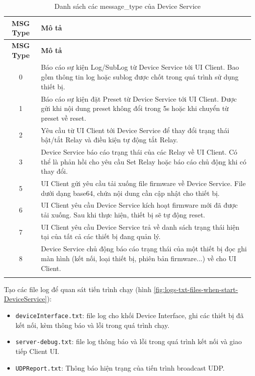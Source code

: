 \begin{longtable}{|c|p{11cm}|}
\hline
\textbf{MSG Type} & \textbf{Mô tả} \\
\hline
\endfirsthead

\hline
\textbf{MSG Type} & \textbf{Mô tả} \\
\hline
\endhead

0 & Báo cáo sự kiện Log/SubLog từ Device Service tới UI Client. Bao gồm thông tin log hoặc sublog được chốt trong quá trình sử dụng thiết bị. \\
\hline

1 & Báo cáo sự kiện đặt Preset từ Device Service tới UI Client. Được gửi khi nội dung preset không đổi trong 5s hoặc khi chuyển từ preset về reset. \\
\hline

2 & Yêu cầu từ UI Client tới Device Service để thay đổi trạng thái bật/tắt Relay và điều kiện tự động tắt Relay. \\
\hline

3 & Device Service báo cáo trạng thái của các Relay về UI Client. Có thể là phản hồi cho yêu cầu Set Relay hoặc báo cáo chủ động khi có thay đổi. \\
\hline

5 & UI Client gửi yêu cầu tải xuống file firmware về Device Service. File dưới dạng base64, chứa nội dung cần cập nhật cho thiết bị. \\
\hline

6 & UI Client yêu cầu Device Service kích hoạt firmware mới đã được tải xuống. Sau khi thực hiện, thiết bị sẽ tự động reset. \\
\hline

7 & UI Client yêu cầu Device Service trả về danh sách trạng thái hiện tại của tất cả các thiết bị đang quản lý. \\
\hline

8 & Device Service chủ động báo cáo trạng thái của một thiết bị đọc ghi màn hình (kết nối, loại thiết bị, phiên bản firmware...) về cho UI Client. \\
\hline

\caption{Danh sách các message\_type của Device Service}
\label{tab:message-types}
\end{longtable}

\FloatBarrier


Tạo các file log để quan sát tiến trình chạy (hình \ref{fig:logs-txt-files-when-start-DeviceService}):

\begin{itemize}
    \item \texttt{deviceInterface.txt}: file log cho khối Device Interface, ghi các thiết bị đã kết nối, kèm thông báo và lỗi trong quá trình chạy.
    \item \texttt{server-debug.txt}: file log thông báo và lỗi trong quá trình kết nối và giao tiếp Client UI.
    \item \texttt{UDPReport.txt}: Thông báo hiện trạng của tiến trình broadcast UDP.
\end{itemize}

